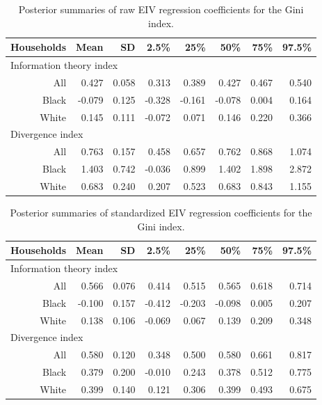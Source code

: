 \documentclass[12pt]{article}
\begin{document}
\begin{table}
  \centering
  \begin{tabular}{rrrrrrrr}
    \hline
    Households & Mean & SD & 2.5\% & 25\% & 50\% & 75\% & 97.5\% \\ 
    \hline
    \multicolumn{8}{l}{Information theory index} \\
    All   &  0.427 & 0.058 &  0.313 &  0.389 &  0.427 & 0.467 & 0.540 \\ 
    Black & -0.079 & 0.125 & -0.328 & -0.161 & -0.078 & 0.004 & 0.164 \\ 
    White &  0.145 & 0.111 & -0.072 &  0.071 &  0.146 & 0.220 & 0.366 \\ 
    \multicolumn{8}{l}{Divergence index} \\  
    All   & 0.763 & 0.157 &  0.458 & 0.657 & 0.762 & 0.868 & 1.074 \\ 
    Black & 1.403 & 0.742 & -0.036 & 0.899 & 1.402 & 1.898 & 2.872 \\ 
    White & 0.683 & 0.240 &  0.207 & 0.523 & 0.683 & 0.843 & 1.155 \\ 
    \hline
  \end{tabular}
  \caption{Posterior summaries of raw EIV regression coefficients for the Gini index.}
  \label{tab:eiv.results.raw}
\end{table}

\begin{table}
  \centering
  \begin{tabular}{rrrrrrrr}
    \hline
    Households & Mean & SD & 2.5\% & 25\% & 50\% & 75\% & 97.5\% \\ 
    \hline
    \multicolumn{8}{l}{Information theory index} \\
    All   &  0.566 & 0.076 &  0.414 &  0.515 &  0.565 & 0.618 & 0.714 \\ 
    Black & -0.100 & 0.157 & -0.412 & -0.203 & -0.098 & 0.005 & 0.207 \\ 
    White &  0.138 & 0.106 & -0.069 &  0.067 &  0.139 & 0.209 & 0.348 \\ 
    \multicolumn{8}{l}{Divergence index} \\
    All   & 0.580 & 0.120 &  0.348 & 0.500 & 0.580 & 0.661 & 0.817 \\ 
    Black & 0.379 & 0.200 & -0.010 & 0.243 & 0.378 & 0.512 & 0.775 \\ 
    White & 0.399 & 0.140 &  0.121 & 0.306 & 0.399 & 0.493 & 0.675 \\ 
    \hline
  \end{tabular}
  \caption{Posterior summaries of standardized EIV regression coefficients for the Gini index.}
  \label{tab:eiv.results.std}
\end{table}
\end{document}
